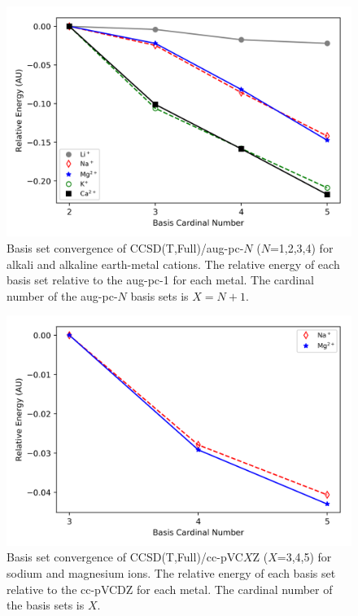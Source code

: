 \begin{figure}[!htbp]
  \centering
    \includegraphics[width=\textwidth]{figures/pes_metals}
    \caption[Basis set convergence for alkali and alkaline earth-metal
    cations.]{Basis set convergence of CCSD(T,Full)/aug-pc-$N$ ($N$=1,2,3,4)
    for alkali and alkaline earth-metal cations. The relative energy of each
    basis set relative to the aug-pc-1 for each metal. The cardinal number of
    the aug-pc-$N$ basis sets is $X=N+1$.} \label{fig:ap_pes_metals}
\end{figure}

\begin{figure}[!htbp]
  \centering
    \includegraphics[width=\textwidth]{figures/ap_pes_metals}
    \caption[Basis set convergence for sodium and magnesium ions with
    core-correlation basis sets.]{Basis set convergence of
    CCSD(T,Full)/cc-pVC$X$Z ($X$=3,4,5) for sodium and magnesium ions. The
    relative energy of each basis set relative to the cc-pVCDZ for each metal.
    The cardinal number of the basis sets is $X$.} \label{fig:ap_pes_metals}
\end{figure}
